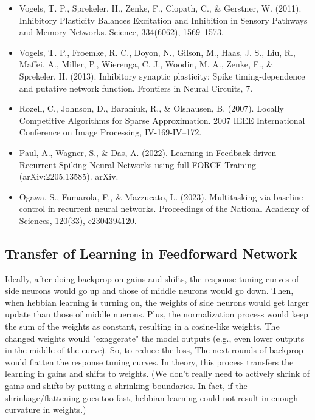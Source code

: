 \documentclass[12pt, a4paper]{article}
\begin{document}
\begin{itemize}
    \item Vogels, T. P., Sprekeler, H., Zenke, F., Clopath, C., \& Gerstner, W. (2011). Inhibitory Plasticity Balances Excitation and Inhibition in Sensory Pathways and Memory Networks. Science, 334(6062), 1569–1573.
    \item Vogels, T. P., Froemke, R. C., Doyon, N., Gilson, M., Haas, J. S., Liu, R., Maffei, A., Miller, P., Wierenga, C. J., Woodin, M. A., Zenke, F., \& Sprekeler, H. (2013). Inhibitory synaptic plasticity: Spike timing-dependence and putative network function. Frontiers in Neural Circuits, 7.
    \item Rozell, C., Johnson, D., Baraniuk, R., \& Olshausen, B. (2007). Locally Competitive Algorithms for Sparse Approximation. 2007 IEEE International Conference on Image Processing, IV-169-IV–172.
    \item Paul, A., Wagner, S., \& Das, A. (2022). Learning in Feedback-driven Recurrent Spiking Neural Networks using full-FORCE Training (arXiv:2205.13585). arXiv.
    \item Ogawa, S., Fumarola, F., \& Mazzucato, L. (2023). Multitasking via baseline control in recurrent neural networks. Proceedings of the National Academy of Sciences, 120(33), e2304394120.
\end{itemize}

\newpage

\subsection*{Transfer of Learning in Feedforward Network}


Ideally, after doing backprop on gains and shifts, the response tuning curves of side neurons would go up and those of middle neurons would go down. Then, when hebbian learning is turning on, the weights of side neurons would get larger update than those of middle nuerons. Plus, the normalization process would keep the sum of the weights as constant, resulting in a cosine-like weights. The changed weights would "exaggerate" the model outputs (e.g., even lower outputs in the middle of the curve). So, to reduce the loss, The next rounds of backprop would flatten the response tuning curves. In theory, this process transfers the learning in gains and shifts to weights. (We don't really need to actively shrink of gains and shifts by putting a shrinking boundaries. In fact, if the shrinkage/flattening goes too fast, hebbian learning could not result in enough curvature in weights.)
\end{document}
